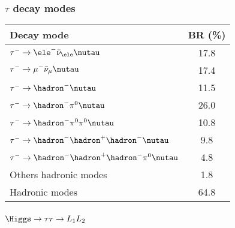 \begin{frame}
\frametitle{$\tau$ decay modes}%
\begin{center}
\begin{tabular}{lc}
\toprule
Decay mode & BR (\%)\\
\midrule
$\tau^-\to \ele^-\bar{\nu}_\ele\nutau$ & \num{17.8} \\
$\tau^-\to \mu^-\bar{\nu}_\mu\nutau$ & \num{17.4} \\
\midrule
$\tau^-\to \hadron^- \nutau$ & \num{11.5} \\
$\tau^-\to \hadron^- \pi^0 \nutau$ & \num{26.0} \\
$\tau^-\to \hadron^- \pi^0\pi^0 \nutau$ & \num{10.8} \\
$\tau^-\to \hadron^- \hadron^+\hadron^- \nutau$ & \num{9.8} \\
$\tau^-\to \hadron^- \hadron^+\hadron^-\pi^0\nutau$ & \num{4.8} \\
Others hadronic modes & \num{1.8} \\
Hadronic modes & \num{64.8} \\
\bottomrule
\end{tabular}
\end{center}
\end{frame}

\begin{frame}
\frametitle{$\Higgs\to\tau\tau\to L_1L_2$}
\begin{center}

\end{center}
\end{frame}

